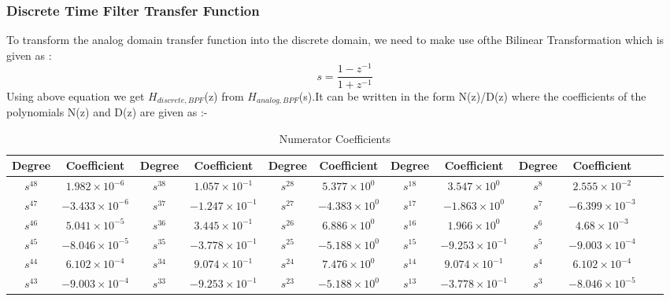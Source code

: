 \documentclass{article}
\begin{document}
\subsubsection{Discrete Time Filter Transfer Function}
To transform the analog domain transfer function into the discrete domain, we need to make use ofthe Bilinear Transformation which is given as :
\begin{equation*}
    s = \frac{1 - z^{-1}}{1 + z^{-1}}
\end{equation*}
Using  above  equation  we  get $H_{discrete,BPF}$(z)  from $H_{analog,BPF}$(s).It  can  be  written  in  the  form N(z)/D(z) where the coefficients of the polynomials N(z) and D(z) are given as :-

\begin{table}[H]
  \centering
		\begin{adjustwidth}{-4.1cm}{}
		\caption{Numerator Coefficients}
		\begin{tabular}{|c|c|c|c|c|c|c|c|c|c|c|c|}
\hline
Degree & Coefficient & Degree & Coefficient & Degree & Coefficient & Degree & Coefficient & Degree & Coefficient\\
\hline
$s^{ 48 }$ & $ 1.982 \times 10^{ -6 }$ & $s^{ 38 }$ & $ 1.057 \times 10^{ -1 }$ & $s^{ 28 }$ & $ 5.377 \times 10^{ 0 }$  & $s^{ 18 }$ & $ 3.547 \times 10^{ 0 }$ & $s^{ 8 }$ & $ 2.555 \times 10^{ -2 }$ \\
\hline
$s^{ 47 }$ & $ -3.433 \times 10^{ -6 }$ & $s^{ 37 }$ & $ -1.247 \times 10^{ -1 }$ & $s^{ 27 }$ & $ -4.383 \times 10^{ 0 }$  & $s^{ 17 }$ & $ -1.863 \times 10^{ 0 }$ & $s^{ 7 }$ & $ -6.399 \times 10^{ -3 }$ \\
\hline
$s^{ 46 }$ & $ 5.041 \times 10^{ -5 }$ & $s^{ 36 }$ & $ 3.445 \times 10^{ -1 }$ & $s^{ 26 }$ & $ 6.886 \times 10^{ 0 }$  & $s^{ 16 }$ & $ 1.966 \times 10^{ 0 }$ & $s^{ 6 }$ & $ 4.68 \times 10^{ -3 }$ \\
\hline
$s^{ 45 }$ & $ -8.046 \times 10^{ -5 }$ & $s^{ 35 }$ & $ -3.778 \times 10^{ -1 }$ & $s^{ 25 }$ & $ -5.188 \times 10^{ 0 }$  & $s^{ 15 }$ & $ -9.253 \times 10^{ -1 }$ & $s^{ 5 }$ & $ -9.003 \times 10^{ -4 }$ \\
\hline
$s^{ 44 }$ & $ 6.102 \times 10^{ -4 }$ & $s^{ 34 }$ & $ 9.074 \times 10^{ -1 }$ & $s^{ 24 }$ & $ 7.476 \times 10^{ 0 }$  & $s^{ 14 }$ & $ 9.074 \times 10^{ -1 }$ & $s^{ 4 }$ & $ 6.102 \times 10^{ -4 }$ \\
\hline
$s^{ 43 }$ & $ -9.003 \times 10^{ -4 }$ & $s^{ 33 }$ & $ -9.253 \times 10^{ -1 }$ & $s^{ 23 }$ & $ -5.188 \times 10^{ 0 }$  & $s^{ 13 }$ & $ -3.778 \times 10^{ -1 }$ & $s^{ 3 }$ & $ -8.046 \times 10^{ -5 }$ \\

\end{tabular}
\end{adjustwidth}
\end{table}
\end{document}
